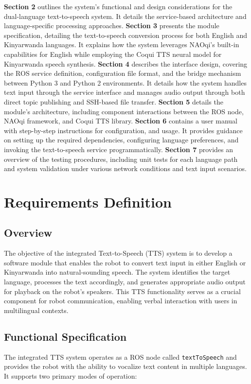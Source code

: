\documentclass{CSSRforAfrica}
\begin{document}
\textbf{Section 2} outlines the system's functional  and design considerations for the dual-language text-to-speech system. It details the service-based architecture and language-specific processing approaches. \textbf{Section 3} presents the module specification, detailing the text-to-speech conversion process for both English and Kinyarwanda languages. It explains how the system leverages NAOqi's built-in capabilities for English while employing the Coqui TTS neural model for Kinyarwanda speech synthesis. \textbf{Section 4} describes the interface design, covering the ROS service definition, configuration file format, and the bridge mechanism between Python 3 and Python 2 environments. It details how the system handles text input through the service interface and manages audio output through both direct topic publishing and SSH-based file transfer. \textbf{Section 5} details the module's architecture, including component interactions between the ROS node, NAOqi framework, and Coqui TTS library. \textbf{Section 6} contains a user manual with step-by-step instructions for configuration, and usage. It provides guidance on setting up the required dependencies, configuring language preferences, and invoking the text-to-speech service programmatically. \textbf{Section 7} provides an overview of the testing procedures, including unit tests for each language path and system validation under various network conditions and text input scenarios.
 
\newpage

\section{Requirements Definition}

\subsection{Overview}
The objective of the integrated Text-to-Speech (TTS) system is to develop a software module that enables the robot to convert text input in either English or Kinyarwanda into natural-sounding speech. The system identifies the target language, processes the text accordingly, and generates appropriate audio output for playback on the robot's speakers. This TTS functionality serves as a crucial component for robot communication, enabling verbal interaction with users in multilingual contexts.

\subsection{Functional Specification}
The integrated TTS system operates as a ROS node called \texttt{textToSpeech} and provides the robot with the ability to vocalize text content in multiple languages. It supports two primary modes of operation:
\end{document}
